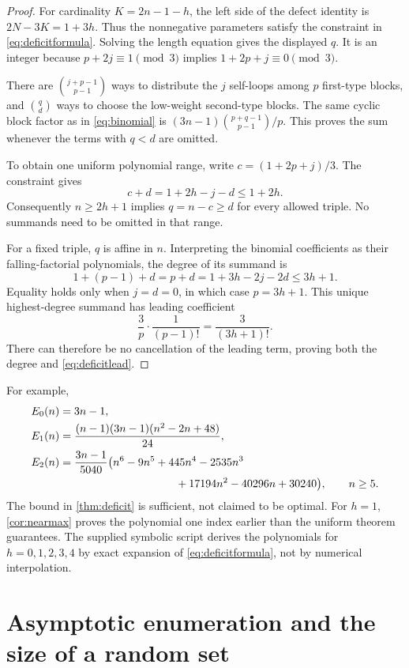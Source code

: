 \documentclass[11pt,a4paper]{article}
\theoremstyle{definition}
\begin{document}
\begin{proof}
For cardinality $K=2n-1-h$, the left side of the defect identity is
$2N-3K=1+3h$. Thus the nonnegative parameters satisfy the constraint in
\cref{eq:deficitformula}. Solving the length equation gives the displayed
$q$. It is an integer because
$p+2j\equiv1\pmod3$ implies $1+2p+j\equiv0\pmod3$.

There are $\binom{j+p-1}{p-1}$ ways to distribute the $j$ self-loops among
$p$ first-type blocks, and $\binom qd$ ways to choose the low-weight
second-type blocks. The same cyclic block factor as in
\cref{eq:binomial} is $(3n-1)\binom{p+q-1}{p-1}/p$. This proves the sum
whenever the terms with $q<d$ are omitted.

To obtain one uniform polynomial range, write
$c=(1+2p+j)/3$. The constraint gives
\[
 c+d=1+2h-j-d\le1+2h.
\]
Consequently $n\ge2h+1$ implies $q=n-c\ge d$ for every allowed triple.
No summands need to be omitted in that range.

For a fixed triple, $q$ is affine in $n$. Interpreting the binomial
coefficients as their falling-factorial polynomials, the degree of its
summand is
\[
 1+(p-1)+d=p+d=1+3h-2j-2d\le3h+1.
\]
Equality holds only when $j=d=0$, in which case $p=3h+1$. This unique
highest-degree summand has leading coefficient
\[
 \frac3p\cdot\frac1{(p-1)!}=\frac3{(3h+1)!}.
\]
There can therefore be no cancellation of the leading term, proving both
the degree and \cref{eq:deficitlead}.
\end{proof}

For example,
\begin{align}
 E_0(n)&=3n-1,\notag\\
 E_1(n)&=\frac{(n-1)(3n-1)(n^2-2n+48)}{24},
 \label{eq:E01}\\
 E_2(n)&=\frac{3n-1}{5040}\bigl(n^6-9n^5+445n^4-2535n^3\notag\\
 &\hspace{37mm}+17194n^2-40296n+30240\bigr),\qquad n\ge5.
 \label{eq:E2}
\end{align}
The bound in \cref{thm:deficit} is sufficient, not claimed to be optimal.
For $h=1$, \cref{cor:nearmax} proves the polynomial one index earlier than
the uniform theorem guarantees. The supplied symbolic script derives the
polynomials for $h=0,1,2,3,4$ by exact expansion of
\cref{eq:deficitformula}, not by numerical interpolation.

\section{Asymptotic enumeration and the size of a random set}
\label{sec:asymptotic}
\end{document}
